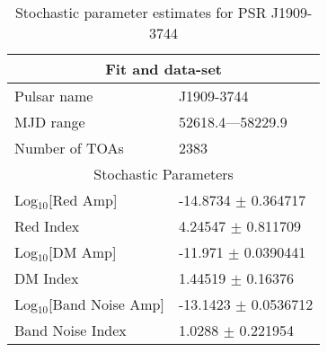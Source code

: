 \documentclass{article}
\begin{document}
\begin{table*}
\caption{Stochastic parameter estimates for PSR J1909-3744}
\begin{tabular}{ll}
\hline\hline
\multicolumn{2}{c}{Fit and data-set} \\ 
\hline
Pulsar name\dotfill & J1909-3744 \\ 
MJD range\dotfill & 52618.4---58229.9 \\ 
Number of TOAs\dotfill & 2383 \\
\hline
\multicolumn{2}{c}{Stochastic Parameters} \\ 
\hline
Log$_{10}$[Red Amp] \dotfill & -14.8734 $\pm$ 0.364717  \\ 
Red Index \dotfill & 4.24547 $\pm$ 0.811709  \\ 
Log$_{10}$[DM Amp] \dotfill & -11.971 $\pm$ 0.0390441  \\ 
DM Index \dotfill & 1.44519 $\pm$ 0.16376  \\ 
Log$_{10}$[Band Noise Amp] \dotfill & -13.1423 $\pm$ 0.0536712  \\ 
Band Noise Index \dotfill & 1.0288 $\pm$ 0.221954  \\ 
\hline
\end{tabular}
\label{Table:J1909-3744}
\end{table*} 
\end{document}
